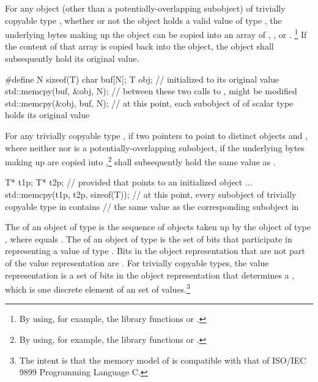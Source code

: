 \pnum
{}%
%
For any object (other than a potentially-overlapping subobject) of trivially copyable type
, whether or not the object holds a valid value of type
, the underlying bytes making up the
object can be copied into an array of
,
, or
.%
\footnote{By using, for example, the library
functions  or .}
If the content of that array
is copied back into the object, the object shall
subsequently hold its original value.
\begin{example}
\begin{codeblock}
#define N sizeof(T)
char buf[N];
T obj;                          //  initialized to its original value
std::memcpy(buf, &obj, N);      // between these two calls to ,  might be modified
std::memcpy(&obj, buf, N);      // at this point, each subobject of  of scalar type holds its original value
\end{codeblock}
\end{example}

\pnum
For any trivially copyable type , if two pointers to  point to
distinct  objects  and , where neither
 nor  is a potentially-overlapping subobject, if the underlying
bytes making up
 are copied into ,\footnote{By using, for example,
the library functions  or .}
  shall subsequently hold the same value as
.
\begin{example}
\begin{codeblock}
T* t1p;
T* t2p;
    // provided that  points to an initialized object ...
std::memcpy(t1p, t2p, sizeof(T));
    // at this point, every subobject of trivially copyable type in  contains
    // the same value as the corresponding subobject in 
\end{codeblock}
\end{example}

\pnum
The 
of an object of type  is the
sequence of   objects taken up
by the object of type , where  equals
.
The 
of an object of type  is the set of bits
that participate in representing a value of type .
Bits in the object representation that are not part of the value representation
are .
For trivially copyable types, the value representation is
a set of bits in the object representation that determines a
, which is one discrete element of an
 set of values.\footnote{The
intent is that the memory model of \Cpp{} is compatible
with that of ISO/IEC 9899 Programming Language C.}

